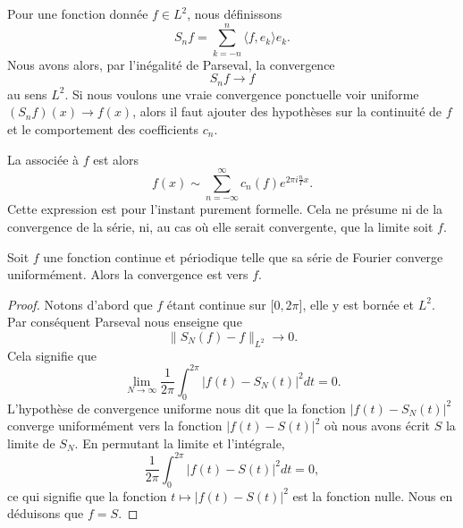 Pour une fonction donnée \( f\in L^2\), nous définissons 
\begin{equation}
    S_nf=\sum_{k=-n}^n\langle f, e_k\rangle e_k.
\end{equation}
Nous avons alors, par l'inégalité de Parseval, la convergence
\begin{equation}
    S_nf\to f
\end{equation}
au sens \( L^2\). Si nous voulons une vraie convergence ponctuelle voir uniforme \( (S_nf)(x)\to f(x)\), alors il faut ajouter des hypothèses sur la continuité de \( f\) et le comportement des coefficients \( c_n\).

La  associée à \( f\) est alors
\begin{equation}
    f(x)\sim\sum_{n=-\infty}^{\infty}c_n(f) e^{2\pi i\frac{ n }{ T }x}.
\end{equation}
Cette expression est pour l'instant purement formelle. Cela ne présume ni de la convergence de la série, ni, au cas où elle serait convergente, que la limite soit \( f\).

\begin{proposition}  \label{PropmrLfGt}
    Soit \( f\) une fonction continue et périodique telle que sa série de Fourier converge uniformément. Alors la convergence est vers \( f\).
\end{proposition}

\begin{proof}
    Notons d'abord que \( f\) étant continue sur \(\mathopen[ 0 , 2\pi \mathclose]\), elle y est bornée et \( L^2\). Par conséquent Parseval nous enseigne que 
    \begin{equation}
        \| S_N(f)-f \|_{L^2}\to 0.
    \end{equation}
    Cela signifie que
    \begin{equation}
        \lim_{N\to \infty} \frac{1}{ 2\pi }\int_{0}^{2\pi}| f(t)-S_N(t) |^2dt=0.
    \end{equation}
    L'hypothèse de convergence uniforme nous dit que la fonction \( | f(t)-S_N(t) |^2\) converge uniformément vers la fonction \( | f(t)-S(t) |^2\) où nous avons écrit \( S\) la limite de \( S_N\). En permutant la limite et l'intégrale,
    \begin{equation}
        \frac{1}{ 2\pi }\int_0^{2\pi}| f(t)-S(t) |^2dt=0,
    \end{equation}
    ce qui signifie que la fonction \( t\mapsto | f(t)-S(t) |^2\) est la fonction nulle. Nous en déduisons que \( f=S\).
\end{proof}

